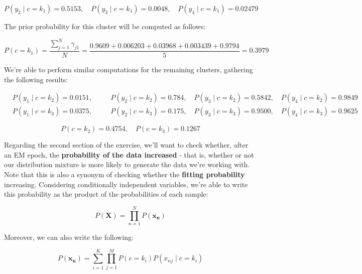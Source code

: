 \documentclass[12pt]{article}
\begin{document}
\begin{enumerate}[leftmargin=\labelsep]
  \begin{equation*}
    P(y_2 \mid c = k_1) = 0.5153, \quad P(y_3 \mid c = k_1) = 0.0048, \quad P(y_4 \mid c = k_1) = 0.02479
  \end{equation*}

  The prior probability for this cluster will be computed as follows:

  \begin{equation*}
    P(c = k_1) = \frac{\sum_{j=1}^N \gamma_{j1}}{N} = \frac{0.9609 + 0.006203 + 0.03968 + 0.003439 + 0.9794}{5} = 0.3979
  \end{equation*}

  We're able to perform similar computations for the remaining clusters, gathering
  the following results:

  \begin{equation*}
    \begin{aligned}
       & P(y_1 \mid c = k_2) = 0.0151, \quad &  & P(y_2 \mid c = k_2) = 0.784, \quad P(y_3 \mid c = k_2) = 0.5842, \quad P(y_4 \mid c = k_2) = 0.9849 \\
       & P(y_1 \mid c = k_3) = 0.0375, \quad &  & P(y_2 \mid c = k_3) = 0.175, \quad P(y_3 \mid c = k_3) = 0.9500, \quad P(y_4 \mid c = k_3) = 0.9625
    \end{aligned}
  \end{equation*}

  \begin{equation*}
    P(c = k_2) = 0.4754, \quad P(c = k_3) = 0.1267
  \end{equation*}

  Regarding the second section of the exercise, we'll want to check whether, after
  an EM epoch, the \textbf{probability of the data increased} - that is, whether or not
  our distribution mixture is more likely to generate the data we're working with.
  Note that this is also a synonym of checking whether the \textbf{fitting probability} increasing.
  Considering conditionally independent variables, we're able to write this probability as
  the product of the probabilities of each sample:

  \begin{equation*}
    P(\mathbf{X}) = \prod_{n=1}^N P(\mathbf{x_n})
  \end{equation*}

  Moreover, we can also write the following:

  \begin{equation*}
    P(\mathbf{x_n}) = \sum_{i=1}^K \prod_{j=1}^M P(c = k_i) P(x_{nj} \mid c = k_i)
  \end{equation*}


\end{enumerate}
\end{document}
